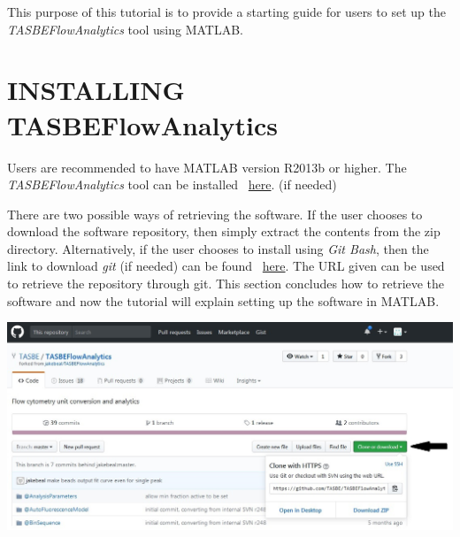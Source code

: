 
	This purpose of this tutorial is to provide a starting guide for users to set up the \textit{TASBEFlowAnalytics} tool using MATLAB. 
   

\section*{INSTALLING TASBEFlowAnalytics} 
 
Users are recommended to have MATLAB version R2013b or higher. 
The \textit{TASBEFlowAnalytics} tool can be installed ~\href{https://github.com/TASBE/TASBEFlowAnalytics}{here}. (if needed) 


There are two possible ways of retrieving the software. If the user chooses to download the software repository, then simply extract the contents from the zip directory. Alternatively, if the user chooses to install using \textit{Git Bash}, then the link to download \textit{git} (if needed) can be found ~\href{https://git-scm.com/downloads}{here}. The URL given can be used to retrieve the repository through git. This section concludes how to retrieve the software and now the tutorial will explain setting up the software in MATLAB. 

\begin{center}
  \includegraphics[width=.90\textwidth]{figures/Download_fig}
\end{center}





